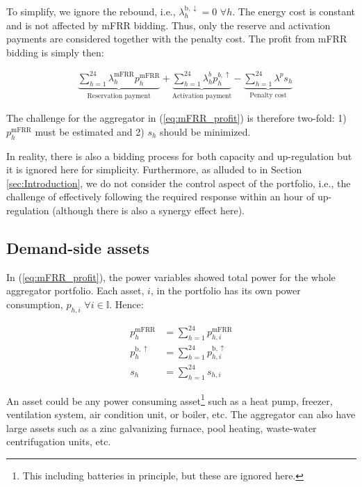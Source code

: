 \documentclass[lettersize,journal]{IEEEtran}
\begin{document}
To simplify, we ignore the rebound, i.e., $\lambda_{h}^{\text{b}, \downarrow} = 0$ $\forall{h}$. The energy cost is constant and is not affected by mFRR bidding. Thus, only the reserve and activation payments are considered together with the penalty cost. The profit from mFRR bidding is simply then:

\begin{align}\label{eq:mFRR_profit}
     & \underbrace{\sum_{h=1}^{24}\lambda_{h}^{\text{mFRR}} p^{\text{mFRR}}_{h}}_{\textrm{Reservation payment}} + \underbrace{\sum_{h=1}^{24}  \lambda_{h}^{b} p^{b,\uparrow}_{h}}_{\textrm{Activation payment}} - \underbrace{ \sum_{h=1}^{24}  \lambda^{p}s_{h}}_{\textrm{Penalty cost}}
\end{align}

The challenge for the aggregator in (\ref{eq:mFRR_profit}) is therefore two-fold: 1) $p^{\text{mFRR}}_{h}$ must be estimated and 2) $s_{h}$ should be minimized.

In reality, there is also a bidding process for both capacity and up-regulation but it is ignored here for simplicity. Furthermore, as alluded to in Section \ref{sec:Introduction}, we do not consider the control aspect of the portfolio, i.e., the challenge of effectively following the required response within an hour of up-regulation (although there is also a synergy effect here).

\subsection{Demand-side assets}

In (\ref{eq:mFRR_profit}), the power variables showed total power for the whole aggregator portfolio. Each asset, $i$, in the portfolio has its own power consumption, $p_{h, i}$ $\forall{i} \in \mathbb{I}$. Hence:

\begin{subequations}
    \begin{align}
        p^{\text{mFRR}}_{h}        & = \sum_{h=1}^{24} p^{\text{mFRR}}_{h, i}        \\
        p^{\text{b}, \uparrow}_{h} & = \sum_{h=1}^{24} p^{\text{b}, \uparrow}_{h, i} \\
        s_{h}                      & = \sum_{h=1}^{24} s_{h, i}
    \end{align}
\end{subequations}

An asset could be any power consuming asset\footnote{This including batteries in principle, but these are ignored here.} such as a heat pump, freezer, ventilation system, air condition unit, or boiler, etc. The aggregator can also have large assets such as a zinc galvanizing furnace, pool heating, waste-water centrifugation units, etc.
\end{document}
